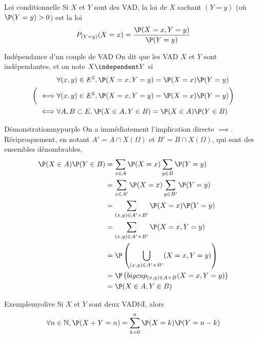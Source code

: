     \begin{defi}{Loi conditionnelle}{}
        Si $X$ et $Y$ sont des VAD, la loi de $X$ sachant $(Y = y)$ (où $\P(Y = y) > 0$) est la loi 
        \[ P_{(Y=y)}(X=x) = \frac{\P(X=x,Y=y)}{\P(Y=y)} \]    
    \end{defi}

    \begin{defitheo}{Indépendance d’un couple de VAD}{}
        On dit que les VAD $X$ et $Y$ sont indépendantes, et on note $X \independent Y$ si 
        \begin{align*}
            &\forall (x,y) \in E^2, \P(X = x, Y = y) = \P(X = x)\P(Y=y) \\
            \bigg( \iff & \forall (x,y) \in E^2, \P(X = x, Y = y) = \P(X = x)\P(Y=y) \bigg) \\
            \iff & \forall A,B \subset E, \P(X \in A, Y \in B) = \P(X \in A)\P(Y \in B) 
        \end{align*}
    \end{defitheo}

    \begin{omed}{Démonstration}{mypurple}
        On a immédiatement l’implication directe $\implies$. Réciproquement, en notant $A' = A \cap X(\Omega)$ et $B' = B \cap X(\Omega)$, qui sont des ensembles dénombrables,
        \begin{align*}
            \P(X \in A) \P(Y \in B) &= \sum_{x \in A} \P(X = x) \sum_{y \in B} \P(Y = y) \\
            &= \sum_{x \in A'} \P(X = x) \sum_{y \in B'} \P(Y = y) \\
            &= \sum_{(x,y) \in A' \times B'} \P(X=x)\P(Y=y) \\
            &= \sum_{(x,y) \in A' \times B'} \P(X=x,Y=y) \\
            &= \P\left(\bigcup_{(x,y) \in A' \times B'} (X=x, Y = y)\right) \\
            &= \P\left(bigcup_{(x,y) \in A \times B} (X=x, Y = y)\right) \\
            &= \P(X \in A, Y \in B)
        \end{align*}
    \end{omed}

    \begin{omed}{Exemple}{myolive}
        Si $X$ et $Y$ sont deux VAD$\mathbb{N}$I, alors 
        \[ \forall n \in \mathbb{N}, \P(X + Y = n) = \sum_{k= 0}^n \P(X = k) \P(Y = n-k) \]  
    \end{omed}

